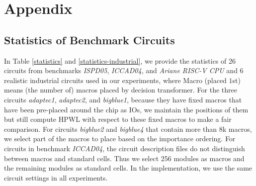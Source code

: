 \documentclass{article}
\theoremstyle{plain}
\theoremstyle{definition}
\theoremstyle{remark}
\begin{document}
\newpage
\appendix
\onecolumn
\section{Appendix}





\subsection{Statistics of Benchmark Circuits}

In Table \ref{statistics} and \ref{statistics-industrial}, we provide the statistics of 26 circuits from benchmarks \textit{ISPD05}, \textit{ICCAD04}, and \textit{Ariane RISC-V CPU} and 6 {realistic} industrial circuits used in our experiments, where Macro (placed $1$st) means (the number of) macros placed by decision transformer.
For the three circuits \textit{adaptec1}, \textit{adaptec2}, and \textit{bigblue1}, because they have fixed macros that have been pre-placed around the chip as IOs, we maintain the positions of them but still compute HPWL with respect to these fixed macros to make a fair comparison. For circuits \textit{bigblue2} and \textit{bigblue4} that contain more than 8k macros, we select part of the macros to place based on the importance ordering. For circuits in benchmark \textit{ICCAD04}, the circuit description files do not distinguish between macros and standard cells. Thus we select 256 modules as macros and the remaining modules as standard cells.
In the implementation, we use the same circuit settings in all experiments. 
\end{document}
